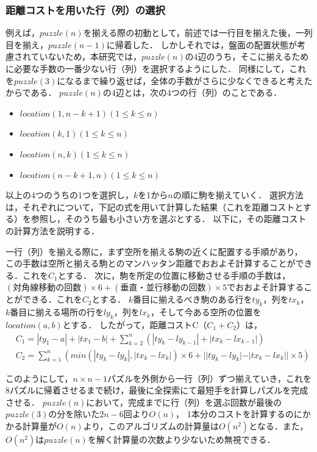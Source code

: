 \subsubsection{距離コストを用いた行（列）の選択}
\label{sec:greed}
例えば，$puzzle(n)$を揃える際の初動として，前述では一行目を揃えた後，一列目を揃え，$puzzle(n-1)$に帰着した．
しかしそれでは，盤面の配置状態が考慮されていないため，本研究では，$puzzle(n)$の4辺のうち，そこに揃えるために必要な手数の一番少ない行（列）を選択するようにした．
同様にして，これを$puzzle(3)$になるまで繰り返せば，全体の手数がさらに少なくできると考えたからである．
$puzzle(n)$の4辺とは，次の4つの行（列）のことである．
\begin{itemize}
	\item $location(1,n-k+1)$$(1\leq k \leq n)$
	\item $location(k,1)$$(1\leq k \leq n)$
	\item $location(n,k)$$(1\leq k \leq n)$
	\item $location(n-k+1,n)$$(1\leq k \leq n)$
\end{itemize}
以上の4つのうちの1つを選択し，$k$を1から$n$の順に駒を揃えていく．
選択方法は，それぞれについて，下記の式を用いて計算した結果（これを距離コストとする）を参照し，そのうち最も小さい方を選ぶとする．
以下に，その距離コストの計算方法を説明する．

一行（列）を揃える際に，まず空所を揃える駒の近くに配置する手順があり，
この手数は空所と揃える駒とのマンハッタン距離でおおよそ計算することができる．これを$C_1$とする．
次に，駒を所定の位置に移動させる手順の手数は，$(対角線移動の回数) \times 6 + (垂直・並行移動の回数) \times 5$でおおよそ計算することができる．これを$C_2$とする．
$k$番目に揃えるべき駒のある行を$ty_k$，列を$tx_k$，$k$番目に揃える場所の行を$ly_k$，列を$lx_k$，そして今ある空所の位置を$location(a,b)$とする．
したがって，距離コストC（$C_1+C_2$）は，
\begin{align*}
	& C_1=|ty_1-a|+|tx_1-b|+\sum_{k=2}^{n}(|ty_k-ly_{k-1}|+|tx_k-lx_{k-1}|) \\
	& C_2=\sum_{k=1}^{n}(min(|ty_k-ly_k|,|tx_k-lx_k|) \times 6+||ty_k-ly_k|-|tx_k-lx_k|| \times 5)
	\label{fig:cost}
\end{align*}

このようにして，$n \times n-1$パズルを外側から一行（列）ずつ揃えていき，これを8パズルに帰着させるまで続け，最後に全探索にて最短手を計算しパズルを完成させる．
$puzzle(n)$において，完成までに行（列）を選ぶ回数が最後の$puzzle(3)$の分を除いた$2n-6$回より$O(n)$，
1本分のコストを計算するのにかかる計算量が$O(n)$より，このアルゴリズムの計算量は$O(n^2)$となる．また，$O(n^2)$は$puzzle(n)$を解く計算量の次数より少ないため無視できる．

